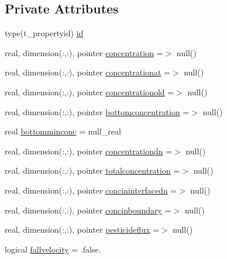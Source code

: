 \subsection*{Private Attributes}
\begin{DoxyCompactItemize}
\item 
type(t\+\_\+propertyid) \mbox{\hyperlink{structmodulerunoffproperties_1_1t__property_a7addc8caf3345877ee7faaf9e31fe529}{id}}
\item 
real, dimension(\+:,\+:), pointer \mbox{\hyperlink{structmodulerunoffproperties_1_1t__property_a239efece6a4e5edfa68167fbc1a2c327}{concentration}} =$>$ null()
\item 
real, dimension(\+:,\+:), pointer \mbox{\hyperlink{structmodulerunoffproperties_1_1t__property_a13c3d2e3d1d50d63f5c89d540d04a959}{concentrationat}} =$>$ null()
\item 
real, dimension(\+:,\+:), pointer \mbox{\hyperlink{structmodulerunoffproperties_1_1t__property_a634888312155762e8beb6e76d3667c8e}{concentrationold}} =$>$ null()
\item 
real, dimension(\+:,\+:), pointer \mbox{\hyperlink{structmodulerunoffproperties_1_1t__property_aeaabdbf11a4d107f4d3ca40afcb67187}{bottomconcentration}} =$>$ null()
\item 
real \mbox{\hyperlink{structmodulerunoffproperties_1_1t__property_a5374747bfbf6185a2e6470e913ac565b}{bottomminconc}} = null\+\_\+real
\item 
real, dimension(\+:,\+:), pointer \mbox{\hyperlink{structmodulerunoffproperties_1_1t__property_a8fd0e115d6a0db620e0c1676de70a3df}{concentrationdn}} =$>$ null()
\item 
real, dimension(\+:,\+:), pointer \mbox{\hyperlink{structmodulerunoffproperties_1_1t__property_a9e899b4e1086d3b57690ed657184d509}{totalconcentration}} =$>$ null()
\item 
real, dimension(\+:,\+:), pointer \mbox{\hyperlink{structmodulerunoffproperties_1_1t__property_a194025520a3b0aa108029a42240fafac}{concininterfacedn}} =$>$ null()
\item 
real, dimension(\+:,\+:), pointer \mbox{\hyperlink{structmodulerunoffproperties_1_1t__property_a886912ee7b7eff0acbc3571f7fcd3023}{concinboundary}} =$>$ null()
\item 
real, dimension(\+:,\+:), pointer \mbox{\hyperlink{structmodulerunoffproperties_1_1t__property_a8074d6549a12c810fa714eda6afae2cb}{pesticideflux}} =$>$ null()
\item 
logical \mbox{\hyperlink{structmodulerunoffproperties_1_1t__property_a6ac567d73e2d39e98e7d585053cf7b85}{fallvelocity}} = .false.

\end{DoxyCompactItemize}
